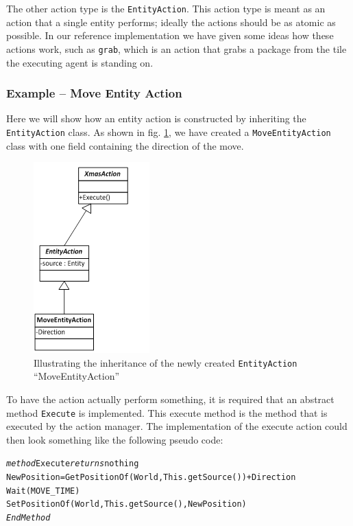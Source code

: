 The other action type is the \texttt{EntityAction}. This action type
is meant as an action that a single entity performs; ideally the actions
should be as atomic as possible. In our reference implementation we
have given some ideas how these actions work, such as \texttt{grab},
which is an action that grabs a package from the tile the executing
agent is standing on.


\subsubsection{Example -- Move Entity Action}

Here we will show how an entity action is constructed by inheriting
the \texttt{EntityAction} class. As shown in fig. \ref{fig:MoveEntityActionExample},
we have created a \texttt{MoveEntityAction} class with one field containing
the direction of the move.

\begin{figure}
\begin{centering}
\includegraphics{MoveEntityActionExample}
\par\end{centering}

\caption{\label{fig:MoveEntityActionExample} Illustrating the inheritance
of the newly created \texttt{EntityAction} ``MoveEntityAction''}
\end{figure}


To have the action actually perform something, it is required that
an abstract method \texttt{Execute} is implemented. This execute method
is the method that is executed by the action manager. The implementation
of the execute action could then look something like the following
pseudo code:

\begin{alltt}
\textit{method} Execute \textit{returns} nothing 
    NewPosition = GetPositionOf(World, This.getSource()) + Direction 
    Wait(MOVE_TIME) 
    SetPositionOf(World,This.getSource(), NewPosition) 
\textit{EndMethod}
\end{alltt}

